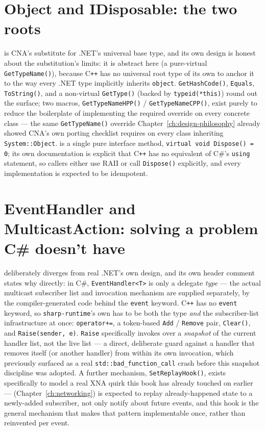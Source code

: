 \section{Object and IDisposable: the two roots}

 is CNA's substitute for .NET's universal base type, and its own
design is honest about the substitution's limits: it is abstract here (a pure-virtual
\texttt{GetTypeName()}), because C\texttt{++} has no universal root type of its own to anchor
it to the way every .NET type implicitly inherits \texttt{object}. \texttt{GetHashCode()},
\texttt{Equals}, \texttt{ToString()}, and a non-virtual \texttt{GetType()} (backed by
\texttt{typeid(*this)}) round out the surface; two macros,
\texttt{GetTypeNameHPP()} / \texttt{GetTypeNameCPP()}, exist purely to reduce the boilerplate of
implementing the required override on every concrete class --- the same
\texttt{GetTypeName()} override Chapter~\ref{ch:design-philosophy} already showed CNA's own
porting checklist requires on every class inheriting \texttt{System::Object}.
 is a single pure interface method,
\texttt{virtual void Dispose() = 0}; its own documentation is explicit that C\texttt{++} has
no equivalent of C\#'s \texttt{using} statement, so callers either use RAII or call
\texttt{Dispose()} explicitly, and every implementation is expected to be idempotent.

\section{EventHandler and MulticastAction: solving a problem C\# doesn't have}

 deliberately diverges from real .NET's own
design, and its own header comment states why directly: in C\#, \texttt{EventHandler<T>} is
only a delegate \emph{type} --- the actual multicast subscriber list and invocation mechanism
are supplied separately, by the compiler-generated code behind the \texttt{event} keyword.
C\texttt{++} has no \texttt{event} keyword, so \texttt{sharp-runtime}'s own
 has to be both the type \emph{and} the subscriber-list
infrastructure at once: \texttt{operator+=}, a token-based \texttt{Add} / \texttt{Remove} pair,
\texttt{Clear()}, and \texttt{Raise(sender, e)}. \texttt{Raise} specifically invokes over a
\emph{snapshot} of the current handler list, not the live list --- a direct, deliberate guard
against a handler that removes itself (or another handler) from within its own invocation,
which previously surfaced as a real \texttt{std::bad\_function\_call} crash before this
snapshot discipline was adopted. A further mechanism, \texttt{SetReplayHook()}, exists
specifically to model a real XNA quirk this book has already touched on earlier ---
 (Chapter~\ref{ch:networking}) is expected to replay
already-happened state to a newly-added subscriber, not only notify about future events, and
this hook is the general mechanism that makes that pattern implementable once, rather than
reinvented per event.


